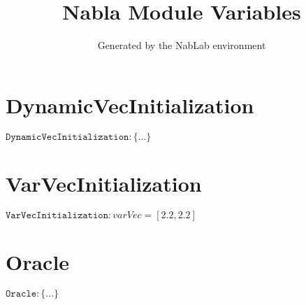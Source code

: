 \documentclass[11pt]{article}
\title{Nabla Module Variables}
\author{Generated by the NabLab environment}
\begin{document}
\maketitle


\section{DynamicVecInitialization}
$\texttt{DynamicVecInitialization} : \{ ... \}$


\section{VarVecInitialization}
$\texttt{VarVecInitialization} : varVec = \left[2.2,2.2\right]$


\section{Oracle}
$\texttt{Oracle} : \{ ... \}$
\end{document}
